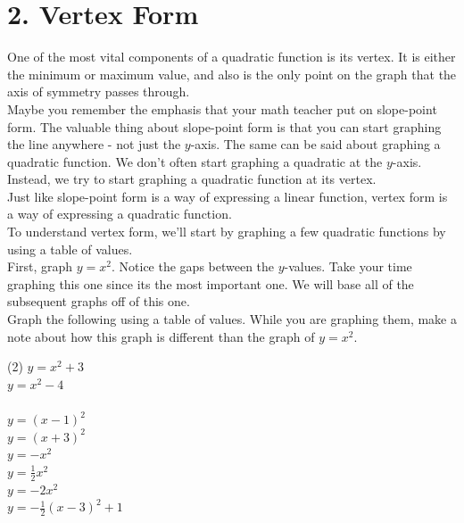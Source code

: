 \documentclass[12pt,fleqn]{book}
\begin{document}
\chapter{2. Vertex Form}
One of the most vital components of a quadratic function is its vertex.  It is either the minimum or maximum value, and also is the only point on the graph that the axis of symmetry passes through.
\\[1em]
Maybe you remember the emphasis that your math teacher put on slope-point form.  The valuable thing about slope-point form is that you can start graphing the line anywhere - not just the $y$-axis.  The same can be said about graphing a quadratic function.  We don't often start graphing a quadratic at the $y$-axis.  Instead, we try to start graphing a quadratic function at its vertex.
\\[1em]
Just like slope-point form is a way of expressing a linear function, vertex form is a way of expressing a quadratic function.
\\[1em]
To understand vertex form, we'll start by graphing a few quadratic functions by using a table of values.
\\[1em]
First, graph $y=x^2$.  Notice the gaps between the $y$-values.  Take your time graphing this one since its the most important one.  We will base all of the subsequent graphs off of this one.
\\[1em]
\clearpage
Graph the following using a table of values.  While you are graphing them, make a note about how this graph is different than the graph of $y=x^2.$ 
\begin{tasks}(2)
	\task $y=x^2 + 3$
	\\[1em]
	\task $y=x^2 - 4$
	\\[1em]
    \\[25em]
	\task $y=(x-1)^2$
	\\[1em]
	\task $y=(x+3)^2$
	\\[1em]
	\task $y=-x^2$
	\\[1em]
	\task $y=\frac12 x^2$
	\\[1em]
	\task $y=-2x^2$
	\\[1em]
	\task $y=-\frac 12 (x-3)^2+1$
	\\[1em]
\end{tasks}
\end{document}
